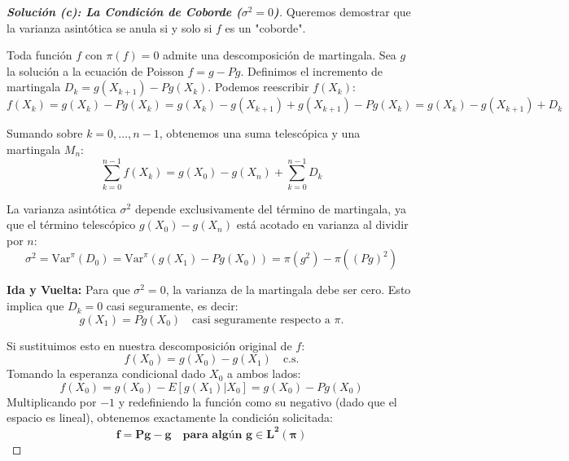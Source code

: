 \documentclass[10pt,a4paper]{article}
\begin{document}
\begin{proof}[\textbf{Solución (c): La Condición de Coborde ($\sigma^2 = 0$)}]
    Queremos demostrar que la varianza asintótica se anula si y solo si $f$ es un "coborde".
    
    Toda función $f$ con $\pi(f)=0$ admite una descomposición de martingala. Sea $g$ la solución a la ecuación de Poisson $f = g - Pg$.
    Definimos el incremento de martingala $D_k = g(X_{k+1}) - Pg(X_k)$. 
    Podemos reescribir $f(X_k)$:
    \[ f(X_k) = g(X_k) - Pg(X_k) = g(X_k) - g(X_{k+1}) + g(X_{k+1}) - Pg(X_k) = g(X_k) - g(X_{k+1}) + D_k \]
    
    Sumando sobre $k = 0, \dots, n-1$, obtenemos una suma telescópica y una martingala $M_n$:
    \[ \sum_{k=0}^{n-1} f(X_k) = g(X_0) - g(X_n) + \sum_{k=0}^{n-1} D_k \]
    
    La varianza asintótica $\sigma^2$ depende exclusivamente del término de martingala, ya que el término telescópico $g(X_0) - g(X_n)$ está acotado en varianza al dividir por $n$:
    \[ \sigma^2 = \text{Var}^\pi(D_0) = \text{Var}^\pi(g(X_1) - Pg(X_0)) = \pi(g^2) - \pi((Pg)^2) \]
    
    \textbf{Ida y Vuelta:}
    Para que $\sigma^2 = 0$, la varianza de la martingala debe ser cero. Esto implica que $D_k = 0$ casi seguramente, es decir:
    \[ g(X_1) = Pg(X_0) \quad \text{casi seguramente respecto a } \pi. \]
    
    Si sustituimos esto en nuestra descomposición original de $f$:
    \[ f(X_0) = g(X_0) - g(X_1) \quad \text{c.s.} \]
    Tomando la esperanza condicional dado $X_0$ a ambos lados:
    \[ f(X_0) = g(X_0) - E[g(X_1) | X_0] = g(X_0) - Pg(X_0) \]
    Multiplicando por $-1$ y redefiniendo la función como su negativo (dado que el espacio es lineal), obtenemos exactamente la condición solicitada:
    \[ \mathbf{f = Pg - g \quad \text{para algún } g \in L^2(\pi)} \]
\end{proof}

\vspace{5mm}
\end{document}
